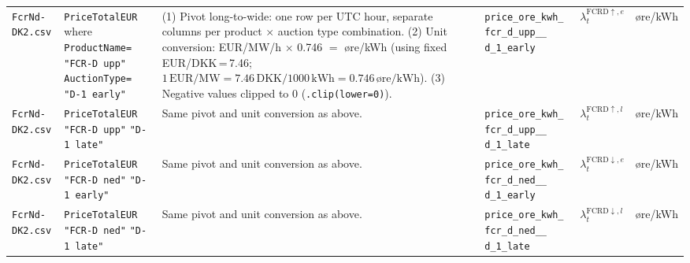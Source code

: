 \documentclass[11pt,a4paper]{article}
\begin{document}
\begin{longtable}{L{2.6cm} L{4.0cm} L{10.2cm} L{4.7cm} C{1.7cm} C{1.6cm}}
\texttt{FcrNd-}\newline
\texttt{DK2.csv} &
\texttt{PriceTotalEUR}\newline
where\newline
\texttt{ProductName=}\newline
\quad\texttt{"FCR-D upp"}\newline
\texttt{AuctionType=}\newline
\quad\texttt{"D-1 early"} &
(1) Pivot long-to-wide: one row per UTC hour, separate columns per
product $\times$ auction type combination.
(2) Unit conversion: EUR/MW/h $\times$ 0.746 $=$ \o{}re/kWh
\newline(using fixed EUR/DKK\,=\,7.46;
$1\,\text{EUR/MW} = 7.46\,\text{DKK}/1000\,\text{kWh} = 0.746\,\text{\o{}re/kWh}$).
(3) Negative values clipped to 0 (\texttt{.clip(lower=0)}). &
\texttt{price\_ore\_kwh\_}\newline
\texttt{fcr\_d\_upp\_\_}\newline
\texttt{d\_1\_early} &
$\lambda_t^{\mathrm{FCRD}\uparrow,e}$ &
\o{}re/kWh \\[6pt]

\texttt{FcrNd-}\newline
\texttt{DK2.csv} &
\texttt{PriceTotalEUR}\newline
\texttt{"FCR-D upp"}\newline
\texttt{"D-1 late"} &
Same pivot and unit conversion as above. &
\texttt{price\_ore\_kwh\_}\newline
\texttt{fcr\_d\_upp\_\_}\newline
\texttt{d\_1\_late} &
$\lambda_t^{\mathrm{FCRD}\uparrow,l}$ &
\o{}re/kWh \\[6pt]

\texttt{FcrNd-}\newline
\texttt{DK2.csv} &
\texttt{PriceTotalEUR}\newline
\texttt{"FCR-D ned"}\newline
\texttt{"D-1 early"} &
Same pivot and unit conversion as above. &
\texttt{price\_ore\_kwh\_}\newline
\texttt{fcr\_d\_ned\_\_}\newline
\texttt{d\_1\_early} &
$\lambda_t^{\mathrm{FCRD}\downarrow,e}$ &
\o{}re/kWh \\[6pt]

\texttt{FcrNd-}\newline
\texttt{DK2.csv} &
\texttt{PriceTotalEUR}\newline
\texttt{"FCR-D ned"}\newline
\texttt{"D-1 late"} &
Same pivot and unit conversion as above. &
\texttt{price\_ore\_kwh\_}\newline
\texttt{fcr\_d\_ned\_\_}\newline
\texttt{d\_1\_late} &
$\lambda_t^{\mathrm{FCRD}\downarrow,l}$ &
\o{}re/kWh \\[6pt]


\end{longtable}
\end{document}
